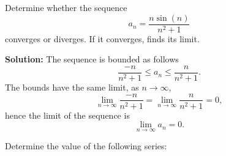\documentclass[11pt]{exam}
\begin{document}
%
%
%

\begin{questions}



\addpoints
\question[2] Determine whether the sequence 
\begin{equation*}
a_n = \frac{n\sin(n)}{n^2+1}
\end{equation*}
converges or diverges. If it converges, finds its limit. 

\textbf{Solution:} The sequence is bounded as follows 
\begin{equation*}
\frac{-n}{n^2+1} \leq a_n \leq \frac{n}{n^2+1}. 
\end{equation*}
The bounds have the same limit, as $n \to \infty$, 
\begin{equation*}
\lim_{n\to \infty} \frac{-n}{n^2+1}=\lim_{n\to \infty} \frac{n}{n^2+1} = 0,
\end{equation*}
hence the limit of the sequence is 
\begin{equation*}
\lim_{n \to \infty} a_n=0.
\end{equation*}

\newpage
\addpoints
\question Determine the value of the following series: 
\end{questions}
\end{document}
